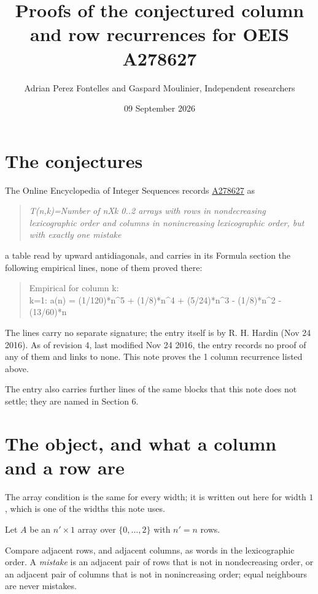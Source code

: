 \documentclass[11pt]{article}
\title{Proofs of the conjectured column and row recurrences for OEIS A278627}
\author{Adrian Perez Fontelles and Gaspard Moulinier, Independent researchers}
\date{09 September 2026}
\theoremstyle{definition}
\begin{document}
\maketitle
\section{The conjectures}

The Online Encyclopedia of Integer Sequences records \href{https://oeis.org/A278627}{A278627} as

\begin{quote}\itshape T(n,k)=Number of nXk 0..2 arrays with rows in nondecreasing lexicographic order and columns in nonincreasing lexicographic order, but with exactly one mistake\end{quote}

a table read by upward antidiagonals, and carries in its Formula section the following empirical lines, none of them proved there:

\begin{quote}\ttfamily Empirical for column k:\\
k=1: a(n) = (1/120)*n\textasciicircum{}5 + (1/8)*n\textasciicircum{}4 + (5/24)*n\textasciicircum{}3 - (1/8)*n\textasciicircum{}2 - (13/60)*n\end{quote}

The lines carry no separate signature; the entry itself is by R. H. Hardin (Nov 24 2016). As of revision 4, last modified Nov 24 2016, the entry records no proof of any of them and links to none. This note proves the 1 column recurrence listed above.

The entry also carries further lines of the same blocks that this note does not settle; they are named in Section 6.

\section{The object, and what a column and a row are}

The array condition is the same for every width; it is written out here for width $1$, which is one of the widths this note uses.

Let $A$ be an $n' \times 1$ array over $\{0,\dots,2\}$ with $n' = n$ rows.

Compare adjacent rows, and adjacent columns, as words in the lexicographic order. A {\itshape mistake} is an adjacent pair of rows that is not in nondecreasing order, or an adjacent pair of columns that is not in nonincreasing order; equal neighbours are never mistakes.
\end{document}
